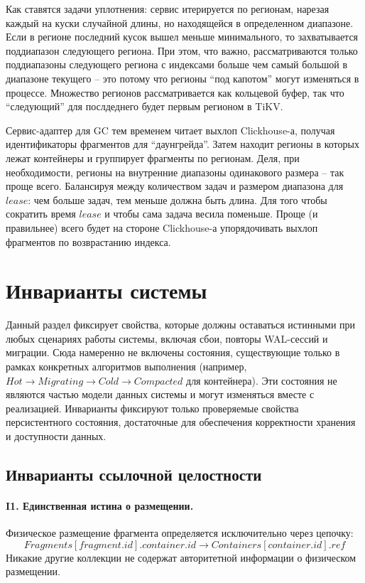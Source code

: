 \documentclass[a4paper,12pt]{article}
\begin{document}
Как ставятся задачи уплотнения: сервис итерируется по регионам, нарезая каждый на куски случайной длины, но находящейся в определенном диапазоне. Если в регионе последний кусок вышел
меньше минимального, то захватывается поддиапазон следующего региона. При этом, что важно, рассматриваются только поддиапазоны следующего региона с индексами больше чем самый
большой в диапазоне текущего – это потому что регионы \enquote{под капотом} могут изменяться в процессе. Множество регионов рассматривается как кольцевой буфер, так что \enquote{следующий}
для послдеднего будет первым регионом в TiKV.

Сервис-адаптер для GC тем временем читает выхлоп Clickhouse-а, получая идентификаторы фрагментов для \enquote{даунгрейда}. Затем находит регионы в которых лежат контейнеры
и группирует фрагменты по регионам. Деля, при необходимости, регионы на внутренние диапазоны одинакового размера – так проще всего. Балансируя между количеством задач и размером
диапазона для $lease$: чем больше задач, тем меньше должна быть длина. Для того чтобы сократить время $lease$ и чтобы сама задача весила поменьше. Проще (и правильнее) всего будет
на стороне Clickhouse-а упорядочивать выхлоп фрагментов по возврастанию индекса.

\newpage

\section{Инварианты системы}

Данный раздел фиксирует свойства, которые должны оставаться истинными при любых
сценариях работы системы, включая сбои, повторы WAL-сессий и миграции. Сюда намеренно не включены состояния, существующие
только в рамках конкретных алгоритмов выполнения (например, $Hot \rightarrow Migrating \rightarrow Cold \rightarrow Compacted$ для контейнера).
Эти состояния не являются частью модели данных системы и могут изменяться вместе с реализацией.
Инварианты фиксируют только проверяемые свойства персистентного состояния, достаточные для обеспечения корректности хранения и доступности данных.

\subsection{Инварианты ссылочной целостности}

\paragraph{I1. Единственная истина о размещении.}
Физическое размещение фрагмента определяется исключительно через цепочку:
\[
Fragments[fragment.id].container.id \rightarrow Containers[container.id].ref
\]
Никакие другие коллекции не содержат авторитетной информации о физическом размещении.
\end{document}
